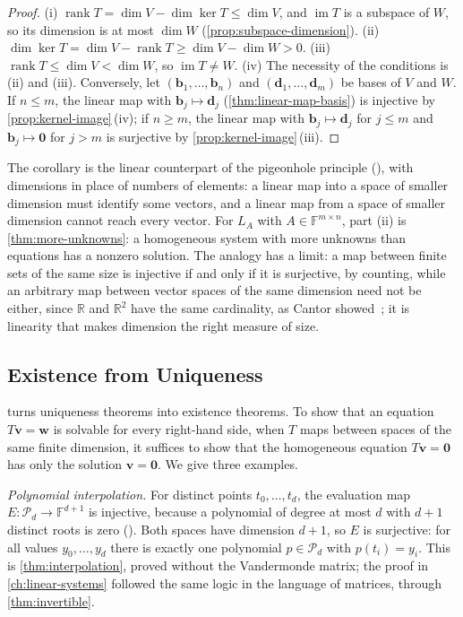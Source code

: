\begin{proof}
(i) $\operatorname{rank}T=\dim V-\dim\ker T\le\dim V$, and $\operatorname{im}T$ is a subspace of $W$, so its dimension is at most $\dim W$ (\cref{prop:subspace-dimension}). (ii) $\dim\ker T=\dim V-\operatorname{rank}T\ge\dim V-\dim W>0$. (iii) $\operatorname{rank}T\le\dim V<\dim W$, so $\operatorname{im}T\ne W$. (iv) The necessity of the conditions is (ii) and (iii). Conversely, let $(\mathbf b_1,\ldots,\mathbf b_n)$ and $(\mathbf d_1,\ldots,\mathbf d_m)$ be bases of $V$ and $W$. If $n\le m$, the linear map with $\mathbf b_j\mapsto\mathbf d_j$ (\cref{thm:linear-map-basis}) is injective by \cref{prop:kernel-image}\,(iv); if $n\ge m$, the linear map with $\mathbf b_j\mapsto\mathbf d_j$ for $j\le m$ and $\mathbf b_j\mapsto\mathbf 0$ for $j>m$ is surjective by \cref{prop:kernel-image}\,(iii).
\end{proof}

The corollary is the linear counterpart of the pigeonhole principle (), with dimensions in place of numbers of elements: a linear map into a space of smaller dimension must identify some vectors, and a linear map from a space of smaller dimension cannot reach every vector. For $L_A$ with $A\in\mathbb F^{m\times n}$, part (ii) is \cref{thm:more-unknowns}: a homogeneous system with more unknowns than equations has a nonzero solution. The analogy has a limit: a map between finite sets of the same size is injective if and only if it is surjective, by counting, while an arbitrary map between vector spaces of the same dimension need not be either, since $\mathbb R$ and $\mathbb R^2$ have the same cardinality, as Cantor showed~\cite{cantor1878}; it is linearity that makes dimension the right measure of size.

\subsection{Existence from Uniqueness}
\label{sec:rank-nullity-applications}

 turns uniqueness theorems into existence theorems. To show that an equation $T\mathbf v=\mathbf w$ is solvable for every right-hand side, when $T$ maps between spaces of the same finite dimension, it suffices to show that the homogeneous equation $T\mathbf v=\mathbf 0$ has only the solution $\mathbf v=\mathbf 0$. We give three examples.

\emph{Polynomial interpolation.} For distinct points $t_0,\ldots,t_d$, the evaluation map $E\colon\mathcal P_d\to\mathbb F^{d+1}$ is injective, because a polynomial of degree at most $d$ with $d+1$ distinct roots is zero (). Both spaces have dimension $d+1$, so $E$ is surjective: for all values $y_0,\ldots,y_d$ there is exactly one polynomial $p\in\mathcal P_d$ with $p(t_i)=y_i$. This is \cref{thm:interpolation}, proved without the Vandermonde matrix; the proof in \cref{ch:linear-systems} followed the same logic in the language of matrices, through \cref{thm:invertible}.

